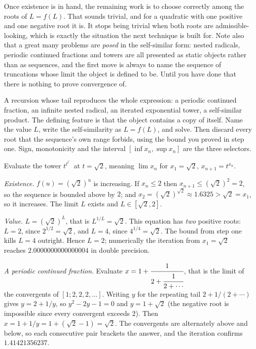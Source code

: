 Once existence is in hand, the remaining work is to choose correctly among the roots of $L=f(L)$. That sounds trivial, and for a quadratic with one positive and one negative root it is. It stops being trivial when both roots are admissible-looking, which is exactly the situation the next technique is built for. Note also that a great many problems are \emph{posed} in the self-similar form: nested radicals, periodic continued fractions and towers are all presented as static objects rather than as sequences, and the first move is always to name the sequence of truncations whose limit the object is defined to be. Until you have done that there is nothing to prove convergence of.

\cue A recursion whose tail reproduces the whole expression: a periodic continued fraction, an infinite nested radical, an iterated exponential tower, a self-similar product. The defining feature is that the object contains a copy of itself.
\method Name the value $L$, write the self-similarity as $L=f(L)$, and solve. Then discard every root that the sequence's own range forbids, using the bound you proved in step one. Sign, monotonicity and the interval $[\inf x_n,\sup x_n]$ are the three selectors.

\begin{worked}
Evaluate the tower $t^{t^{t^{\cdots}}}$ at $t=\sqrt2$, meaning $\lim x_n$ for $x_1=\sqrt2$, $x_{n+1}=t^{x_n}$.

\emph{Existence.} $f(u)=(\sqrt2)^{u}$ is increasing. If $x_n\leq2$ then $x_{n+1}\leq(\sqrt2)^2=2$, so the sequence is bounded above by $2$; and $x_2=(\sqrt2)^{\sqrt2}\approx1.6325>\sqrt2=x_1$, so it increases. The limit $L$ exists and $L\in[\sqrt2,2]$.

\emph{Value.} $L=(\sqrt2)^{L}$, that is $L^{1/L}=\sqrt2$. This equation has \emph{two} positive roots: $L=2$, since $2^{1/2}=\sqrt2$, and $L=4$, since $4^{1/4}=\sqrt2$. The bound from step one kills $L=4$ outright. Hence $L=2$; numerically the iteration from $x_1=\sqrt2$ reaches $2.0000000000000004$ in double precision.

\emph{A periodic continued fraction.} Evaluate $x=1+\cfrac{1}{2+\cfrac{1}{2+\cdots}}$, that is the limit of the convergents of $[1;2,2,2,\ldots]$. Writing $y$ for the repeating tail $2+1/(2+\cdots)$ gives $y=2+1/y$, so $y^2-2y-1=0$ and $y=1+\sqrt2$ (the negative root is impossible since every convergent exceeds $2$). Then $x=1+1/y=1+(\sqrt2-1)=\sqrt2$. The convergents are alternately above and below, so each consecutive pair brackets the answer, and the iteration confirms $1.41421356237$.
\end{worked}

